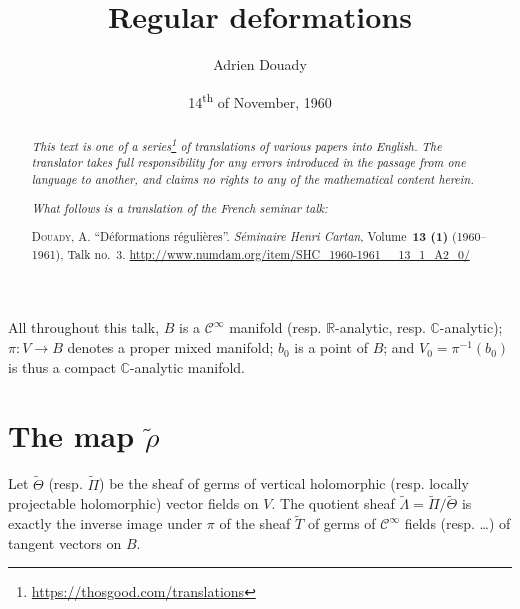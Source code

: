 \documentclass{article}
\title{Regular deformations}
\author{Adrien Douady}
\date{14\textsuperscript{th} of November, 1960}
\theoremstyle{plain}
\theoremstyle{definition}
\newcommand{\RR}{\mathbb{R}}
\newcommand{\CC}{\mathbb{C}}
\newcommand{\oldpage}[1]{\marginpar{\footnotesize$\Big\vert$ \textit{p.~#1}}}
\begin{document}
\maketitle
\thispagestyle{fancy}

\renewcommand{\abstractname}{Translator's note.}

\begin{abstract}
  \renewcommand*{\thefootnote}{\fnsymbol{footnote}}
  \emph{This text is one of a series\footnote{\url{https://thosgood.com/translations}} of translations of various papers into English.}
  \emph{The translator takes full responsibility for any errors introduced in the passage from one language to another, and claims no rights to any of the mathematical content herein.}

  \medskip
  
  \emph{What follows is a translation of the French seminar talk:}

  \medskip\noindent
  \textsc{Douady, A.}
  ``D\'{e}formations r\'{e}guli\`{e}res''.
  \emph{S\'{e}minaire Henri Cartan}, Volume~\textbf{13 (1)} (1960--1961), Talk no.~3.
  {\url{http://www.numdam.org/item/SHC_1960-1961__13_1_A2_0/}}
\end{abstract}

\setcounter{footnote}{0}

\tableofcontents
\bigskip



\oldpage{3-01}
All throughout this talk, $B$ is a $\mathscr{C}^\infty$ manifold (resp. $\RR$-analytic, resp. $\CC$-analytic); $\pi\colon V\to B$ denotes a proper mixed manifold; $b_0$ is a point of $B$; and $V_0=\pi^{-1}(b_0)$ is thus a compact $\CC$-analytic manifold.


\section{The map \texorpdfstring{$\widetilde{\rho}$}{p}}
\label{I}

Let $\widetilde{\Theta}$ (resp. $\widetilde{\Pi}$) be the sheaf of germs of vertical holomorphic (resp. locally projectable holomorphic) vector fields on $V$.
The quotient sheaf $\widetilde{\Lambda}=\widetilde{\Pi}/\widetilde{\Theta}$ is exactly the inverse image under $\pi$ of the sheaf $\widetilde{T}$ of germs of $\mathscr{C}^\infty$ fields (resp. \ldots) of tangent vectors on $B$.
\end{document}
